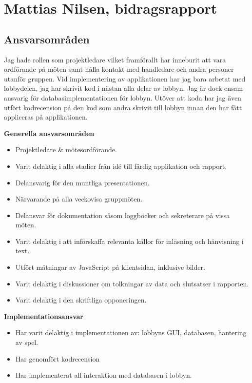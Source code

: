 \section{Mattias Nilsen, bidragsrapport}
\subsection{Ansvarsområden}
Jag hade rollen som projektledare vilket framförallt har inneburit att vara ordförande på möten samt hålla kontakt med handledare och andra personer utanför gruppen.
Vid implementering av applikationen har jag bara arbetat med lobbydelen, jag har skrivit kod i nästan alla delar av lobbyn. Jag är dock ensam ansvarig för databasimplementationen för lobbyn.
Utöver att koda har jag även utfört kodrecension på den kod som andra skrivit till lobbyn innan den har fått appliceras på applikationen.

\textbf{Generella ansvarsområden}
\begin{itemize}
    \item Projektledare \& mötesordförande.
    \item Varit delaktig i alla stadier från idé till färdig applikation och rapport.
    \item Delansvarig för den muntliga presentationen.
    \item Närvarande på alla veckovisa gruppmöten.
    \item Delansvar för dokumentation såsom loggböcker och sekreterare på vissa möten.
    \item Varit delaktig i att införskaffa relevanta källor för inläsning och hänvisning i text.
    \item Utfört mätningar av JavaScript på klientsidan, inklusive bilder.
    \item Varit delaktig i diskussioner om tolkningar av data och slutsatser i rapporten.
    \item Varit delaktig i den skriftliga opponeringen.
\end{itemize}

\textbf{Implementationsansvar}
\begin{itemize}
    \item Har varit delaktig i implementationen av: lobbyns GUI, databasen, hantering av spel.
    \item Har genomfört kodrecension
    \item Har implementerat all interaktion med databasen i lobbyn.
\end{itemize}

